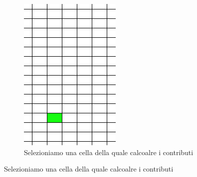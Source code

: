 \documentclass[a4paper,10pt]{report}
\theoremstyle{plain}
\theoremstyle{definition}
\theoremstyle{remark}
\begin{document}
\begin{figure}[p]
\begin{subfigure}[t]{.48\linewidth}
 \includegraphics[width=.85\linewidth]{img/CellSelected}
 \caption{Selezioniamo una cella della quale calcoalre i contributi}
 \label{fig:sel_cell}
 \vspace{4ex}
 \end{subfigure}
 

\end{figure}
\end{document}
